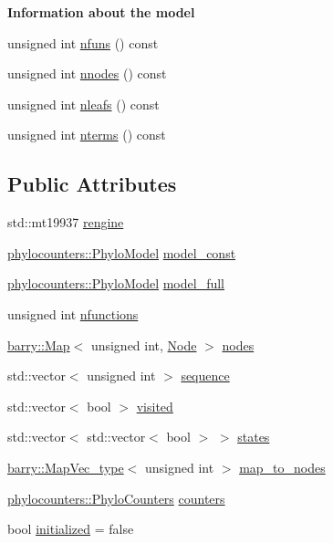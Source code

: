 \begin{Indent}\textbf{ Information about the model}\par
\begin{DoxyCompactItemize}
\item 
unsigned int \hyperlink{class_a_phylo_model_ad50c485128331dcfc3e24ef3765d36ef}{nfuns} () const
\item 
unsigned int \hyperlink{class_a_phylo_model_a5a13086298e421d18ed60e6ecfced009}{nnodes} () const
\item 
unsigned int \hyperlink{class_a_phylo_model_adfb761d08367323cd94e917a5249bd86}{nleafs} () const
\item 
unsigned int \hyperlink{class_a_phylo_model_ada9ba3e2df8586216573fa27566d92cb}{nterms} () const
\end{DoxyCompactItemize}
\end{Indent}
\subsection*{Public Attributes}
\begin{DoxyCompactItemize}
\item 
std\+::mt19937 \hyperlink{class_a_phylo_model_a3f7a406330ca376840dcea3324e69448}{rengine}
\item 
\hyperlink{namespacebarry_1_1counters_1_1phylo_ad32b4186e3bab93119df225fddc3c609}{phylocounters\+::\+Phylo\+Model} \hyperlink{class_a_phylo_model_ad91e946cad1e96aa444b586921d1ebe6}{model\+\_\+const}
\item 
\hyperlink{namespacebarry_1_1counters_1_1phylo_ad32b4186e3bab93119df225fddc3c609}{phylocounters\+::\+Phylo\+Model} \hyperlink{class_a_phylo_model_a79c9e748c657487a60497265348f8a14}{model\+\_\+full}
\item 
unsigned int \hyperlink{class_a_phylo_model_aceefd34597d56589a10162c937d8200f}{nfunctions}
\item 
\hyperlink{namespacebarry_a979a04835a9855ff2054c383c569c89e}{barry\+::\+Map}$<$ unsigned int, \hyperlink{class_node}{Node} $>$ \hyperlink{class_a_phylo_model_af48d7223972ea6f74d2780b316db730e}{nodes}
\item 
std\+::vector$<$ unsigned int $>$ \hyperlink{class_a_phylo_model_a5f15ec301385244387c9be5290f5ee28}{sequence}
\item 
std\+::vector$<$ bool $>$ \hyperlink{class_a_phylo_model_ac98b6767ff0c32b30caf23dbf6810578}{visited}
\item 
std\+::vector$<$ std\+::vector$<$ bool $>$ $>$ \hyperlink{class_a_phylo_model_aa6a0a51491c065588bb3504d9b84540c}{states}
\item 
\hyperlink{namespacebarry_a2f0d3aab1d67e4c8eaeab9022e16139f}{barry\+::\+Map\+Vec\+\_\+type}$<$ unsigned int $>$ \hyperlink{class_a_phylo_model_ae041cf2aa3630fab0a050e176c9317f9}{map\+\_\+to\+\_\+nodes}
\item 
\hyperlink{namespacebarry_1_1counters_1_1phylo_a4e401ffe66d04091343dcffaf915f8c3}{phylocounters\+::\+Phylo\+Counters} \hyperlink{class_a_phylo_model_ac301d6887933072072bdf3472df5c8a3}{counters}
\item 
bool \hyperlink{class_a_phylo_model_a298c38ef857994159589a6c0f7578150}{initialized} = false
\end{DoxyCompactItemize}


